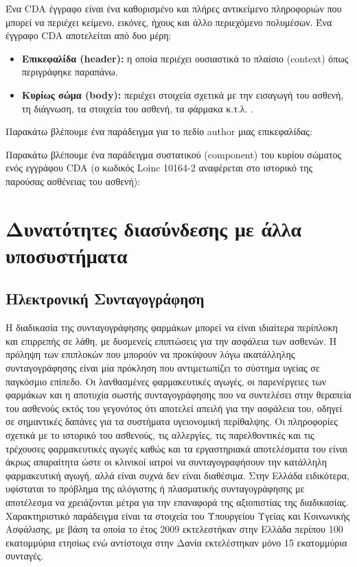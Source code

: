	Ένα CDA έγγραφο είναι ένα καθορισμένο και πλήρες αντικείμενο πληροφοριών που μπορεί να περιέχει κείμενο, εικόνες, ήχους και άλλο περιεχόμενο πολυμέσων. Ένα έγγραφο CDA αποτελείται από δυο μέρη:
	\begin{itemize}
		\item \textbf{Επικεφαλίδα (header): } η οποία περιέχει ουσιαστικά το πλαίσιο (context) όπως περιγράφηκε παραπάνω.
		\item \textbf{Κυρίως σώμα (body): } περιέχει στοιχεία σχετικά με την εισαγωγή του ασθενή, τη διάγνωση, τα στοιχεία του ασθενή, τα φάρμακα κ.τ.λ. .
	\end{itemize}
	
	Παρακάτω βλέπουμε ένα παράδειγμα για το πεδίο author μιας επικεφαλίδας:
	
	Παρακάτω βλέπουμε ένα παράδειγμα συστατικού (component) του κυρίου σώματος ενός εγγράφου CDA (ο κωδικός Loinc 10164-2 αναφέρεται στο ιστορικό της παρούσας ασθένειας του ασθενή):
	
		
\section{Δυνατότητες διασύνδεσης με άλλα υποσυστήματα}

	\subsection{Ηλεκτρονική Συνταγογράφηση}
	
		Η διαδικασία της συνταγογράφησης φαρμάκων μπορεί να είναι ιδιαίτερα περίπλοκη και επιρρεπής σε λάθη, με
δυσμενείς επιπτώσεις για την ασφάλεια των ασθενών. Η πρόληψη των επιπλοκών που μπορούν να προκύψουν λόγω ακατάλληλης συνταγογράφησης είναι μία πρόκληση που αντιμετωπίζει το σύστημα υγείας σε παγκόσμιο επίπεδο. Οι λανθασμένες φαρμακευτικές αγωγές, οι παρενέργειες των φαρμάκων και η αποτυχία σωστής συνταγογράφησης που να συντελέσει στην θεραπεία του ασθενούς εκτός του γεγονότος ότι αποτελεί απειλή για την ασφάλεια του, οδηγεί σε σημαντικές δαπάνες για τα συστήματα υγειονομική περίθαλψης. Οι πληροφορίες σχετικά με το ιστορικό του ασθενούς, τις αλλεργίες, τις παρελθοντικές και τις τρέχουσες φαρμακευτικές αγωγές καθώς και τα εργαστηριακά αποτελέσματα του είναι άκρως απαραίτητα ώστε οι κλινικοί ιατροί να συνταγογραφήσουν την κατάλληλη φαρμακευτική αγωγή, αλλά είναι συχνά δεν είναι διαθέσιμα. \cite{prescribingErrors} Στην Ελλάδα ειδικότερα, υφίσταται το πρόβλημα της αλόγιστης ή πλασματικής συνταγογράφησης με αποτέλεσμα να  χρειάζονται μέτρα για την επαναφορά της αξιοπιστίας της διαδικασίας.  Χαρακτηριστικό παράδειγμα είναι τα στοιχεία του Υπουργείου Υγείας και Κοινωνικής Ασφάλισης, με βάση τα οποία το έτος 2009 εκτελεστήκαν στην Ελλάδα περίπου 100 εκατομμύρια ετησίως ενώ αντίστοιχα στην Δανία εκτελέστηκαν μόνο 15 εκατομμύρια συνταγές.



